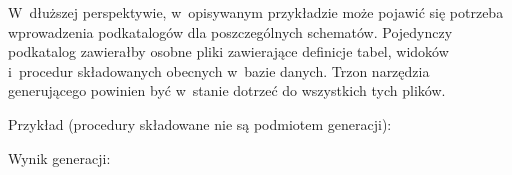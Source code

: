 W~dłuższej perspektywie, w~opisywanym przykładzie może pojawić się potrzeba wprowadzenia podkatalogów dla poszczególnych schematów.
Pojedynczy podkatalog zawierałby osobne pliki zawierające definicje tabel, widoków i~procedur składowanych obecnych w~bazie danych.
Trzon narzędzia generującego powinien być w~stanie dotrzeć do wszystkich tych plików.

Przykład (procedury składowane nie są podmiotem generacji):


Wynik generacji:

